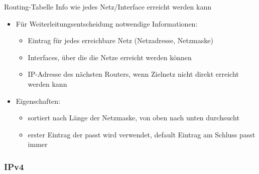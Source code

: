 \begin{definition}{Routing-Tabelle} Info wie jedes Netz/Interface erreicht werden kann
    
    \begin{itemize}
        \item Für Weiterleitungsentscheidung notwendige Informationen:
        \begin{itemize}
            \item Eintrag für jedes erreichbare Netz (Netzadresse, Netzmaske)
            \item Interfaces, über die die Netze erreicht werden können
            \item IP-Adresse des nächsten Routers, wenn Zielnetz nicht direkt erreicht werden kann
        \end{itemize}
        \item Eigenschaften:
        \begin{itemize}
            \item sortiert nach Länge der Netzmaske, von oben nach unten durchsucht
            \item erster Eintrag der passt wird verwendet, default Eintrag am Schluss passt immer
        \end{itemize}        
    \end{itemize}
\end{definition}

\subsubsection{IPv4}

